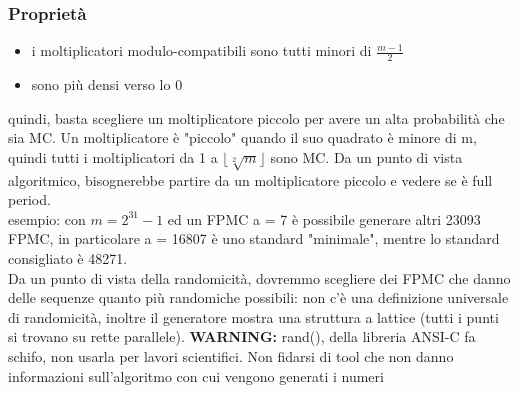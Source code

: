 \documentclass{article}
\begin{document}
\subsubsection{Proprietà}
\begin{itemize}
\item i moltiplicatori modulo-compatibili sono tutti minori di $\frac{m-1}{2}$
\item sono più densi verso lo 0
\end{itemize}
quindi, basta scegliere un moltiplicatore piccolo per avere un alta probabilità che sia MC. Un moltiplicatore è "piccolo" quando il suo quadrato è minore di m, quindi tutti i moltiplicatori da 1 a $\lfloor \sqrt[2]{m} \rfloor$ sono MC. Da un punto di vista algoritmico, bisognerebbe partire da un moltiplicatore piccolo e vedere se è full period.\\ esempio: con $m = 2^{31} - 1$ ed un FPMC a = 7 è possibile generare altri 23093 FPMC, in particolare a = 16807 è uno standard "minimale", mentre lo standard consigliato è 48271. \\ Da un punto di vista della randomicità, dovremmo scegliere dei FPMC che danno delle sequenze quanto più randomiche possibili: non c'è una definizione universale di randomicità, inoltre il generatore mostra una struttura a lattice (tutti i punti si trovano su rette parallele).
\textbf{WARNING:} rand(), della libreria ANSI-C fa schifo, non usarla per lavori scientifici. Non fidarsi di tool che non danno informazioni sull'algoritmo  con cui vengono generati i numeri
\end{document}
